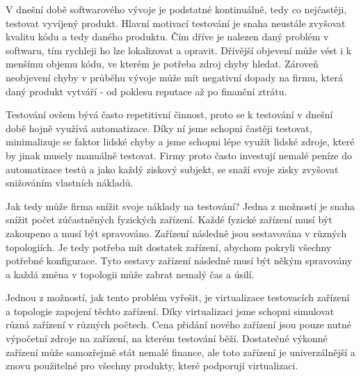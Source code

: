 \begin{introduction}
V dnešní době softwarového vývoje je podstatné kontinuálně, tedy co nejčastěji, testovat vyvíjený produkt. Hlavní motivací testování je snaha neustále zvyšovat kvalitu kódu a tedy daného produktu. Čím dříve je nalezen daný problém v softwaru, tím rychleji ho lze lokalizovat a opravit. Dřívější objevení může vést i k menšímu objemu kódu, ve kterém je potřeba zdroj chyby hledat. Zároveň neobjevení chyby v průběhu vývoje může mít negativní dopady na firmu, která daný produkt vytváří - od poklesu reputace až po finanční ztrátu.

Testování ovšem bývá často repetitivní činnost, proto se k testování v dnešní době hojně využívá automatizace. Díky ní jsme schopni častěji testovat, minimalizuje se faktor lidské chyby a jsme schopni lépe využít lidské zdroje, které by jinak musely manuálně testovat. Firmy proto často investují nemalé peníze do automatizace testů a jako každý ziskový subjekt, se snaží svoje zisky zvyšovat snižováním vlastních nákladů. 

Jak tedy může firma snížit svoje náklady na testování? Jedna z možností je snaha snížit počet zúčastněných fyzických zařízení. Každé fyzické zařízení musí být zakoupeno a musí být spravováno. Zařízení následně jsou sestavována v různých topologiích. Je tedy potřeba mít dostatek zařízení, abychom pokryli všechny potřebné konfigurace. Tyto sestavy zařízení následně musí být někým spravovány a každá změna v topologii může zabrat nemalý čas a úsilí.

Jednou z možností, jak tento problém vyřešit, je virtualizace testovacích zařízení a topologie zapojení těchto zařízení. Díky virtualizaci jsme schopni simulovat různá zařízení v různých počtech. Cena přidání nového zařízení jsou pouze nutné výpočetní zdroje na zařízení, na kterém testování běží. Dostatečné výkonné zařízení může samozřejmě stát nemalé finance, ale toto zařízení je univerzálnější a znovu použitelné pro všechny produkty, které podporují virtualizaci.

\end{introduction}